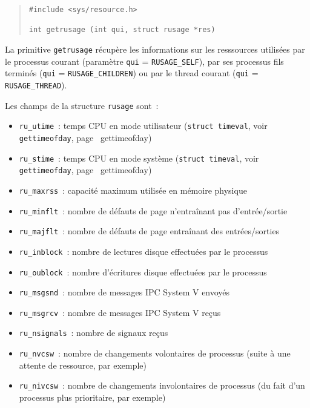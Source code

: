 \documentclass [twoside] {report}
\begin{document}
\begin {quote}
\begin {verbatim}
#include <sys/resource.h>

int getrusage (int qui, struct rusage *res)
\end{verbatim}
\end {quote}

La primitive {\tt getrusage} récupère les informations sur les
resssources utilisées par le processus courant (paramètre \texttt {qui}
= \texttt {RUSAGE\_SELF}), par ses processus fils terminés (\texttt {qui}
= \texttt {RUSAGE\_CHILDREN}) ou par le thread courant (\texttt {qui}
= \texttt {RUSAGE\_THREAD}).

Les champs de la structure \texttt {rusage} sont~:

\begin {itemize}
    \item \texttt {ru\_utime}~: temps CPU en mode utilisateur (\texttt
	{struct timeval}, voir \texttt {gettimeofday}, page~\pageref
	{gettimeofday})
    \item \texttt {ru\_stime}~: temps CPU en mode système (\texttt
	{struct timeval}, voir \texttt {gettimeofday}, page~\pageref
	{gettimeofday})
    \item \texttt {ru\_maxrss}~: capacité maximum utilisée en mémoire
	physique
    \item \texttt {ru\_minflt}~: nombre de défauts de page n'entraînant
	pas d'entrée/sortie
    \item \texttt {ru\_majflt}~: nombre de défauts de page entraînant
	des entrées/sorties
    \item \texttt {ru\_inblock}~: nombre de lectures disque effectuées
	par le processus
    \item \texttt {ru\_oublock}~: nombre d'écritures disque effectuées
	par le processus
    \item \texttt {ru\_msgsnd}~: nombre de messages IPC System V envoyés
    \item \texttt {ru\_msgrcv}~: nombre de messages IPC System V reçus
    \item \texttt {ru\_nsignals}~: nombre de signaux reçus \item \texttt
    {ru\_nvcsw}~: nombre de changements volontaires de
	processus (suite à une attente de ressource, par exemple)
    \item \texttt {ru\_nivcsw}~: nombre de changements involontaires
	de processus (du fait d'un processus plus prioritaire, par
	exemple)

\end {itemize}
\end{document}
